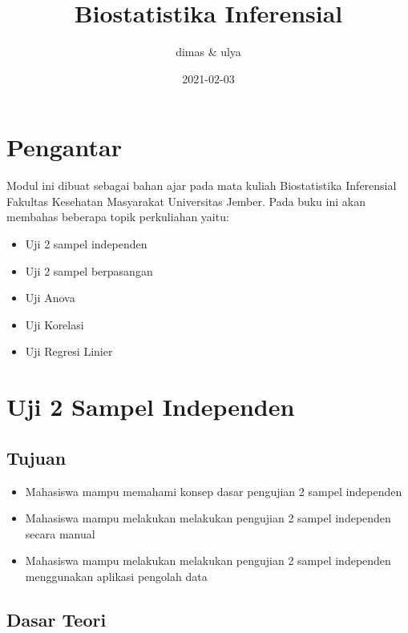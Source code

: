\documentclass[
]{book}
\title{Biostatistika Inferensial}
\author{dimas \& ulya}
\date{2021-02-03}
\providecommand{\tightlist}{%
  \setlength{\itemsep}{0pt}\setlength{\parskip}{0pt}}
\begin{document}
\maketitle

{
\setcounter{tocdepth}{1}
\tableofcontents
}
\hypertarget{pengantar}{%
\chapter{Pengantar}\label{pengantar}}

Modul ini dibuat sebagai bahan ajar pada mata kuliah Biostatistika Inferensial Fakultas Kesehatan Masyarakat Universitas Jember. Pada buku ini akan membahas beberapa topik perkuliahan yaitu:

\begin{itemize}
\tightlist
\item
  Uji 2 sampel independen
\item
  Uji 2 sampel berpasangan
\item
  Uji Anova
\item
  Uji Korelasi
\item
  Uji Regresi Linier
\end{itemize}

\hypertarget{uji2sampelind}{%
\chapter{Uji 2 Sampel Independen}\label{uji2sampelind}}

\hypertarget{tujuan}{%
\section{Tujuan}\label{tujuan}}

\begin{itemize}
\tightlist
\item
  Mahasiswa mampu memahami konsep dasar pengujian 2 sampel independen
\item
  Mahasiswa mampu melakukan melakukan pengujian 2 sampel independen secara manual
\item
  Mahasiswa mampu melakukan melakukan pengujian 2 sampel independen menggunakan aplikasi pengolah data
\end{itemize}

\hypertarget{dasar-teori}{%
\section{Dasar Teori}\label{dasar-teori}}
\end{document}

